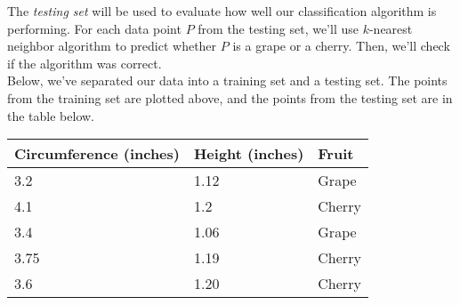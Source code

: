 \documentclass[10pt]{article}
\begin{document}
The \emph{testing set} will be used to evaluate how well our classification algorithm is performing. For each data point $P$ from the testing set, we'll use $k$-nearest neighbor algorithm to predict whether $P$ is a grape or a cherry. Then, we'll check if the algorithm was correct.\\

Below, we've separated our data into a training set and a testing set. The points from the training set are plotted above, and the points from the testing set are in the table below.

\begin{center}
\end{center}

\begin{center}
\begin{tabular}{|p{3.5cm}|p{3.5cm}|p{2cm}|}
\hline
Circumference (inches) & Height (inches) & Fruit\\
\hline
 3.2 & 1.12 & Grape\\\hline
 4.1 & 1.2 & Cherry\\\hline
 3.4 & 1.06 & Grape\\\hline
 3.75 & 1.19 & Cherry\\\hline
 3.6 & 1.20 & Cherry\\
 
\hline
\end{tabular}
\end{center}

\newpage
\end{document}
